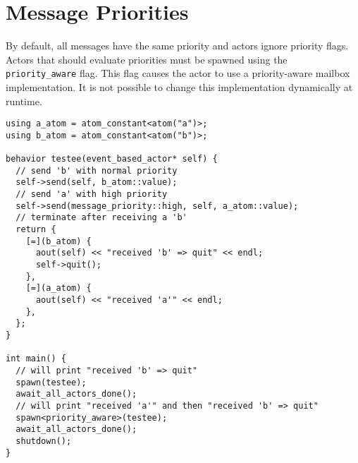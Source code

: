 \section{Message Priorities}

By default, all messages have the same priority and actors ignore priority flags.
Actors that should evaluate priorities must be spawned using the \lstinline^priority_aware^ flag.
This flag causes the actor to use a priority-aware mailbox implementation.
It is not possible to change this implementation dynamically at runtime.

\begin{lstlisting}
using a_atom = atom_constant<atom("a")>;
using b_atom = atom_constant<atom("b")>;

behavior testee(event_based_actor* self) {
  // send 'b' with normal priority
  self->send(self, b_atom::value);
  // send 'a' with high priority
  self->send(message_priority::high, self, a_atom::value);
  // terminate after receiving a 'b'
  return {
    [=](b_atom) {
      aout(self) << "received 'b' => quit" << endl;
      self->quit();
    },
    [=](a_atom) {
      aout(self) << "received 'a'" << endl;
    },
  };
}

int main() {
  // will print "received 'b' => quit"
  spawn(testee);
  await_all_actors_done();
  // will print "received 'a'" and then "received 'b' => quit"
  spawn<priority_aware>(testee);
  await_all_actors_done();
  shutdown();
}
\end{lstlisting}
